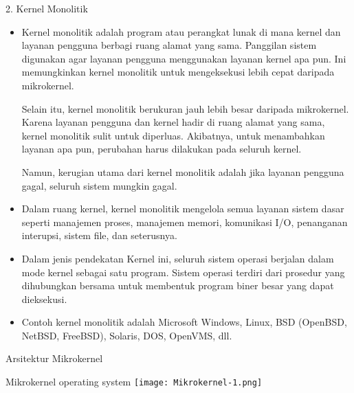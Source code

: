 \documentclass{beamer}
\begin{document}
	\begin{frame}{2. Kernel Monolitik}
		\begin{itemize}
	\item Kernel monolitik adalah program atau perangkat lunak di mana kernel dan layanan pengguna berbagi ruang alamat yang sama. Panggilan sistem digunakan agar layanan pengguna menggunakan layanan kernel apa pun. Ini memungkinkan kernel monolitik untuk mengeksekusi lebih cepat daripada mikrokernel.
	
	Selain itu, kernel monolitik berukuran jauh lebih besar daripada mikrokernel. Karena layanan pengguna dan kernel hadir di ruang alamat yang sama, kernel monolitik sulit untuk diperluas. Akibatnya, untuk menambahkan layanan apa pun, perubahan harus dilakukan pada seluruh kernel.
	
	Namun, kerugian utama dari kernel monolitik adalah jika layanan pengguna gagal, seluruh sistem mungkin gagal.
	

		\item Dalam ruang kernel, kernel monolitik mengelola semua layanan sistem dasar seperti manajemen proses, manajemen memori, komunikasi I/O, penanganan interupsi, sistem file, dan seterusnya.
		
		\item Dalam jenis pendekatan Kernel ini, seluruh sistem operasi berjalan dalam mode kernel sebagai satu program. Sistem operasi terdiri dari prosedur yang dihubungkan bersama untuk membentuk program biner besar yang dapat dieksekusi.
		
		\item Contoh kernel monolitik adalah Microsoft Windows, Linux, BSD (OpenBSD, NetBSD, FreeBSD), Solaris, DOS, OpenVMS, dll.

	\end{itemize}
\end{frame}

\begin{frame}{Arsitektur Mikrokernel}
	
	Mikrokernel operating system
	\texttt{[image: Mikrokernel-1.png]} 
	
	
\end{frame}
\end{document}
